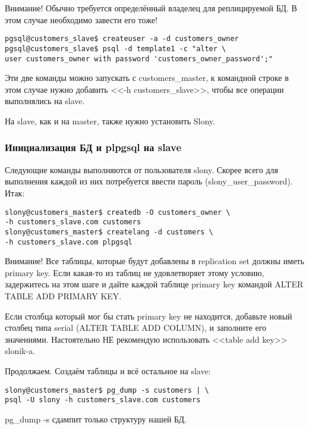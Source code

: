 Внимание! Обычно требуется определённый владелец для реплицируемой БД. В этом случае необходимо завести его тоже!
\begin{verbatim}
pgsql@customers_slave$ createuser -a -d customers_owner
pgsql@customers_slave$ psql -d template1 -c "alter \
user customers_owner with password 'customers_owner_password';"
\end{verbatim}

Эти две команды можно запускать с customers\_master, к командной строке в этом случае нужно добавить 
<<-h customers\_slave>>, чтобы все операции выполнялись на slave.

На slave, как и на master, также нужно установить Slony.

\subsubsection{Инициализация БД и plpgsql на slave}

Следующие команды выполняются от пользователя slony. Скорее всего для выполнения каждой из них потребуется 
ввести пароль (slony\_user\_password). Итак:
\begin{verbatim}
slony@customers_master$ createdb -O customers_owner \
-h customers_slave.com customers
slony@customers_master$ createlang -d customers \
-h customers_slave.com plpgsql
\end{verbatim}

Внимание! Все таблицы, которые будут добавлены в replication set должны иметь primary key. 
Если какая-то из таблиц не удовлетворяет этому условию, задержитесь на этом шаге и дайте каждой таблице primary key 
командой ALTER TABLE ADD PRIMARY KEY.

Если столбца который мог бы стать primary key не находится, добавьте новый столбец типа serial (ALTER TABLE ADD COLUMN), 
и заполните его значениями. Настоятельно НЕ рекомендую использовать <<table add key>> slonik-a.

Продолжаем.
Создаём таблицы и всё остальное на slave:
\begin{verbatim}
slony@customers_master$ pg_dump -s customers | \
psql -U slony -h customers_slave.com customers
\end{verbatim}

pg\_dump -s сдампит только структуру нашей БД.

